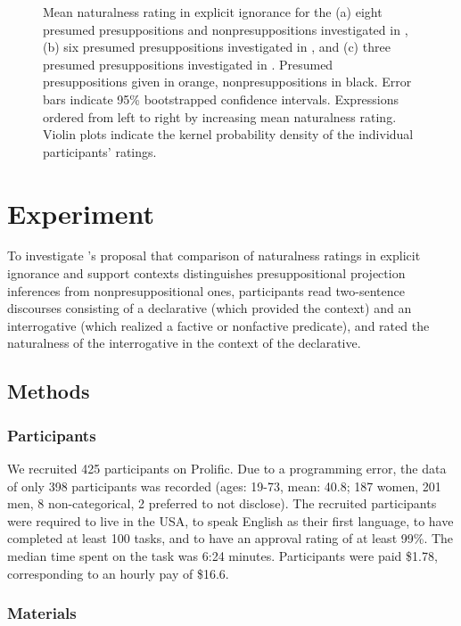\documentclass[11pt,fleqn]{article}
\newcommand{\6}{\mbox{$[\hspace*{-.6mm}[$}}
\newcommand{\9}{\mbox{$]\hspace*{-.6mm}]$}}
\newcommand{\citepos}[1]{\citeauthor{#1}'s \citeyear{#1}}
\begin{document}
\begin{figure}[h!]
\caption{Mean naturalness rating in explicit ignorance for the (a)  eight presumed presuppositions and nonpresuppositions investigated in \citealt[Exp.~3]{mandelkern-etal2020}, (b) six presumed presuppositions investigated in \citealt[Exp.~1]{kalomoiros-schwarz2024}, and (c) three presumed presuppositions investigated in \citealt[Exp.2]{kalomoiros-schwarz2024}. Presumed presuppositions given in orange, nonpresuppositions in black. Error bars indicate 95\% bootstrapped confidence intervals. Expressions ordered from left to right by increasing mean naturalness rating. Violin plots indicate the kernel probability density of the individual participants' ratings.}\label{fig:eic}
\end{figure}

\section{Experiment}\label{s2}

To investigate \citepos{mandelkern-etal2020} proposal that comparison of naturalness ratings in explicit ignorance and support contexts distinguishes presuppositional projection inferences from nonpresuppositional ones, participants read two-sentence discourses consisting of a declarative (which provided the context) and an interrogative (which realized a factive or nonfactive predicate), and rated the naturalness of the interrogative in the context of the declarative.

\subsection{Methods}\label{s-methods}

\subsubsection{Participants}

We recruited 425 participants on Prolific. Due to a programming error, the data of only 398 participants was recorded (ages: 19-73, mean: 40.8; 187 women, 201 men, 8 non-categorical, 2 preferred to not disclose). The recruited participants were required to live in the USA, to speak English as their first language, to have completed at least 100 tasks, and to have an approval rating of at least 99\%. The median time spent on the task was 6:24 minutes. Participants were paid \$1.78, corresponding to an hourly pay of \$16.6.


\subsubsection{Materials}
\end{document}
